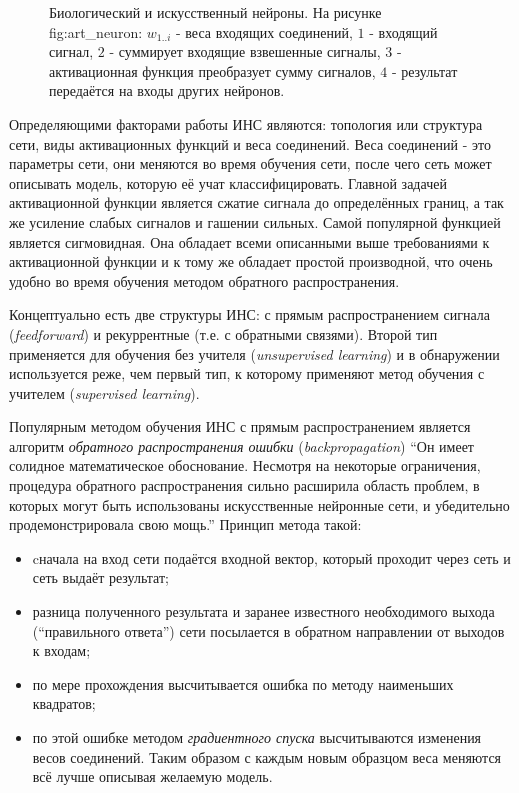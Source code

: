 \documentclass[12pt]{report}
\newenvironment{myItemize}{
 	\vspace{-10pt}
	\begin{itemize}[nolistsep]
}{\end{itemize}}
\begin{document}
\begin{figure}[h]
	\centering
	\caption{Биологический  и искусственный  нейроны. На рисунке \subref
{fig:art_neuron}: $w_{1..i}$ - веса входящих соединений, $1$ - входящий сигнал, $2$ - суммирует входящие взвешенные 
сигналы, $3$ - активационная функция преобразует сумму сигналов, $4$ - результат передаётся на входы других 
нейронов.}
	\label{fig:neurons}
\end{figure}

Определяющими факторами работы ИНС являются: топология или структура сети, виды активационных функций и веса 
соединений. Веса соединений - это параметры сети, они меняются во время обучения сети, после чего сеть может 
описывать модель, которую её учат классифицировать. Главной задачей активационной функции является сжатие сигнала 
до 
определённых границ, а так же усиление слабых сигналов и гашении сильных. Самой популярной функцией является 
сигмовидная. Она обладает всеми описанными выше требованиями к активационной функции и к тому же 
обладает простой производной, что очень удобно во время обучения методом обратного распространения. \citep
{wasserman1989neural}

Концептуально есть две структуры ИНС: с прямым распространением сигнала (\textit{feedforward}) и рекуррентные (т.е. 
с 
обратными связями). Второй тип применяется для обучения без учителя (\textit{unsupervised learning}) и в 
обнаружении 
используется реже, чем первый тип, к которому применяют метод обучения с учителем (\textit{supervised learning}).

Популярным методом обучения ИНС с прямым распространением является алгоритм \emph{обратного распространения ошибки} 
(\textit{backpropagation}) ``Он имеет солидное математическое обоснование. Несмотря на некоторые ограничения, 
процедура обратного распространения сильно расширила область проблем, в которых могут быть использованы 
искусственные 
нейронные сети, и убедительно продемонстрировала свою мощь.'' \citep{wasserman1989neural} Принцип метода такой: 
\begin{myItemize}
\item cначала на вход сети подаётся входной вектор, который проходит через сеть и сеть выдаёт результат;
\item разница полученного результата и заранее известного необходимого выхода (``правильного ответа'') сети 
посылается в обратном направлении от выходов к входам;
\item по мере прохождения высчитывается ошибка по методу наименьших квадратов;
\item по этой ошибке методом \emph{градиентного спуска} высчитываются изменения весов соединений. Таким образом с 
каждым новым образцом веса меняются всё лучше описывая желаемую модель.
\end{myItemize}
\end{document}
